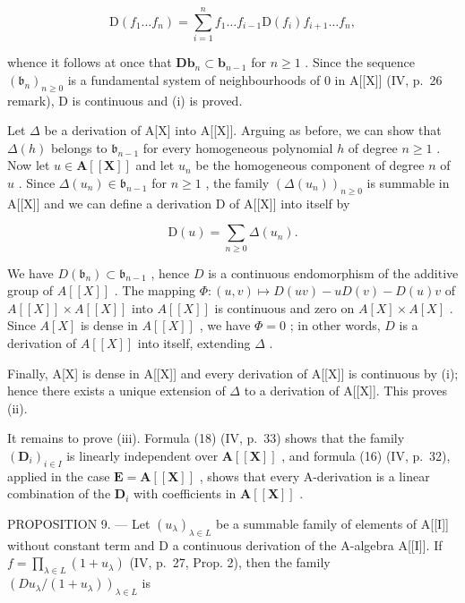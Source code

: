 \[
\mathrm{D} (f _ {1} \dots f _ {n}) = \sum_ {i = 1} ^ {n} f _ {1} \dots f _ {i - 1} \mathrm{D} (f _ {i}) f _ {i + 1} \dots f _ {n},
\]

whence it follows at once that \(\mathbf{Db}_{n} \subset \mathbf{b}_{n-1}\) for \(n \geqslant 1\) . Since the sequence \((\mathfrak{b}_n)_{n \geqslant 0}\) is a fundamental system of neighbourhoods of 0 in A{[}{[}X{]}{]} (IV, p.~26 remark), D is continuous and (i) is proved.

Let \(\Delta\) be a derivation of A{[}X{]} into A{[}{[}X{]}{]}. Arguing as before, we can show that \(\Delta(h)\) belongs to \(\mathfrak{b}_{n-1}\) for every homogeneous polynomial \(h\) of degree \(n \geqslant 1\) . Now let \(u \in \mathbf{A}[[\mathbf{X}]]\) and let \(u_n\) be the homogeneous component of degree \(n\) of \(u\) . Since \(\Delta(u_n) \in \mathfrak{b}_{n-1}\) for \(n \geqslant 1\) , the family \((\Delta(u_n))_{n \geqslant 0}\) is summable in A{[}{[}X{]}{]} and we can define a derivation D of A{[}{[}X{]}{]} into itself by

\[
\mathrm{D} (u) = \sum_ {n \geqslant 0} \Delta \left(u _ {n}\right).
\]

We have \(D(\mathfrak{b}_n) \subset \mathfrak{b}_{n-1}\) , hence \(D\) is a continuous endomorphism of the additive group of \(A[[X]]\) . The mapping \(\Phi: (u, v) \mapsto D(uv) - uD(v) - D(u)v\) of \(A[[X]] \times A[[X]]\) into \(A[[X]]\) is continuous and zero on \(A[X] \times A[X]\) . Since \(A[X]\) is dense in \(A[[X]]\) , we have \(\Phi = 0\) ; in other words, \(D\) is a derivation of \(A[[X]]\) into itself, extending \(\Delta\) .

Finally, A{[}X{]} is dense in A{[}{[}X{]}{]} and every derivation of A{[}{[}X{]}{]} is continuous by (i); hence there exists a unique extension of \(\Delta\) to a derivation of A{[}{[}X{]}{]}. This proves (ii).

It remains to prove (iii). Formula (18) (IV, p.~33) shows that the family \((\mathbf{D}_i)_{i\in I}\) is linearly independent over \(\mathbf{A}[[\mathbf{X}]]\) , and formula (16) (IV, p.~32), applied in the case \(\mathbf{E} = \mathbf{A}[[\mathbf{X}]]\) , shows that every A-derivation is a linear combination of the \(\mathbf{D}_i\) with coefficients in \(\mathbf{A}[[\mathbf{X}]]\) .

PROPOSITION 9. --- Let \((u_{\lambda})_{\lambda \in L}\) be a summable family of elements of A{[}{[}I{]}{]} without constant term and D a continuous derivation of the A-algebra A{[}{[}I{]}{]}. If \(f = \prod_{\lambda \in L} (1 + u_{\lambda})\) (IV, p.~27, Prop. 2), then the family \((D u_{\lambda} / (1 + u_{\lambda}))_{\lambda \in L}\) is

